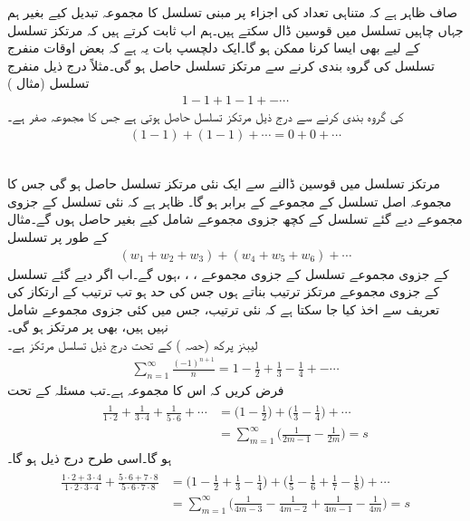 صاف ظاہر ہے کہ متناہی تعداد کی اجزاء پر مبنی تسلسل کا مجموعہ تبدیل کیے بغیر ہم جہاں چاہیں تسلسل میں قوسین ڈال سکتے ہیں۔ہم اب ثابت کرتے ہیں کہ مرتکز تسلسل کے لیے بھی ایسا کرنا ممکن ہو گا۔ایک دلچسپ بات یہ ہے کہ بعض اوقات منفرج تسلسل کی گروہ بندی کرنے سے مرتکز تسلسل حاصل ہو گی۔مثلاً درج ذیل منفرج تسلسل (مثال )
\begin{align*}
1-1+1-1+-\cdots
\end{align*} 
کی گروہ بندی کرنے سے درج ذیل مرتکز تسلسل حاصل ہوتی ہے جس کا مجموعہ صفر ہے۔
\begin{align*}
(1-1)+(1-1)+\cdots=0+0+\cdots
\end{align*}

\quad {}\\
مرتکز تسلسل میں قوسین ڈالنے سے ایک نئی مرتکز تسلسل حاصل ہو گی جس کا مجموعہ اصل تسلسل کے مجموعے کے برابر ہو گا۔
\quad
ظاہر ہے کہ نئی تسلسل کے جزوی مجموعے دیے گئے تسلسل کے کچھ جزوی مجموعے  شامل کیے بغیر حاصل ہوں گے۔مثال کے طور پر تسلسل
\begin{align*}
(w_1+w_2+w_3)+(w_4+w_5+w_6)+\cdots
\end{align*} 
کے جزوی مجموعے تسلسل  کے جزوی مجموعے  ، ، ، ہوں گے۔اب اگر دیے گئے تسلسل کے جزوی مجموعے  مرتکز ترتیب بناتے ہوں جس کی حد  ہو تب ترتیب کے ارتکاز کی تعریف سے اخذ کیا جا سکتا ہے کہ نئی ترتیب، جس میں کئی جزوی مجموعے شامل نہیں ہیں، بھی  پر مرتکز ہو گی۔
\quad {}\\
لیبنز پرکھ (حصہ ) کے تحت درج ذیل تسلسل مرتکز ہے۔
\begin{align*}
\sum\limits_{n=1}^{\infty} \frac{(-1)^{n+1}}{n}=1-\frac{1}{2}+\frac{1}{3}-\frac{1}{4}+-\cdots
\end{align*}
فرض کریں کہ اس کا مجموعہ  ہے۔تب مسئلہ  کے تحت
\begin{gather}
\begin{aligned}\label{مساوات_ترتیب_تسلسل_ایک}
\frac{1}{1\cdot 2}+\frac{1}{3\cdot 4}+\frac{1}{5\cdot 6}+\cdots&=\big(1-\frac{1}{2}\big)+\big(\frac{1}{3}-\frac{1}{4}\big)+\cdots\\
&=\sum\limits_{m=1}^{\infty}\big(\frac{1}{2m-1}-\frac{1}{2m}\big)=s
\end{aligned}
\end{gather}
ہو گا۔اسی طرح درج ذیل ہو گا۔
\begin{gather}
\begin{aligned}\label{مساوات_ترتیب_تسلسل_دو}
\frac{1\cdot 2+3\cdot 4}{1\cdot 2\cdot 3\cdot 4}+\frac{5\cdot 6+7\cdot 8}{5\cdot 6\cdot 7\cdot 8}&=\big(1-\frac{1}{2}+\frac{1}{3}-\frac{1}{4}\big)+\big(\frac{1}{5}-\frac{1}{6}+\frac{1}{7}-\frac{1}{8}\big)+\cdots\\
&=\sum\limits_{m=1}^{\infty} \big(\frac{1}{4m-3}-\frac{1}{4m-2}+\frac{1}{4m-1}-\frac{1}{4m}\big)=s
\end{aligned}
\end{gather}

